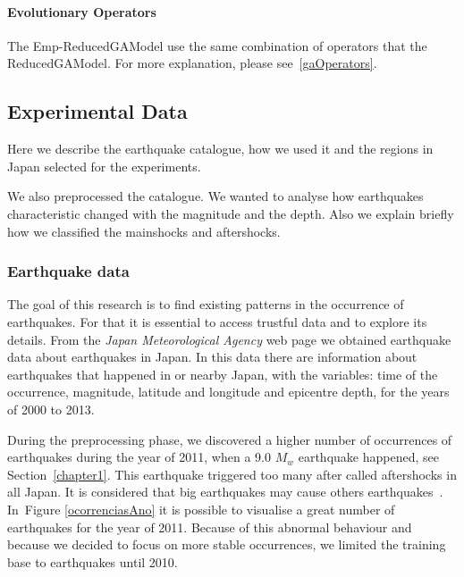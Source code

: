 \paragraph{Evolutionary Operators}
The Emp-ReducedGAModel use the same combination of operators that the ReducedGAModel. For more explanation, please see~\ref{gaOperators}.


\subsection{Experimental Data}
Here we describe the earthquake catalogue, how we used it and the regions in Japan selected for the experiments.

We also preprocessed the catalogue. We wanted to analyse how earthquakes characteristic changed with the magnitude and the depth. Also we explain briefly how we classified the mainshocks and aftershocks.

\subsubsection{Earthquake data}
The goal of this research is to find existing patterns in the occurrence of earthquakes. For that it is essential to access trustful data and to explore its details. From the  {\it Japan Meteorological Agency} web page we obtained earthquake data about earthquakes in Japan. In this data there are information about earthquakes that happened in or nearby Japan,  with the variables: time of the occurrence, magnitude, latitude and longitude and epicentre depth, for the years of 2000 to 2013.

During the preprocessing phase, we discovered a higher number of occurrences of earthquakes during the year of 2011, when a 9.0 $M_w$ earthquake happened, see Section~\ref{chapter1}. This earthquake triggered too many after called aftershocks in all Japan. It is considered that big earthquakes may cause others earthquakes~\cite{zhuang2004analyzing}. In~Figure \ref{ocorrenciasAno} it is possible to visualise a great number of earthquakes for the year of 2011. Because of this abnormal behaviour and because we decided to focus on more stable occurrences, we limited the training base to earthquakes until 2010.

